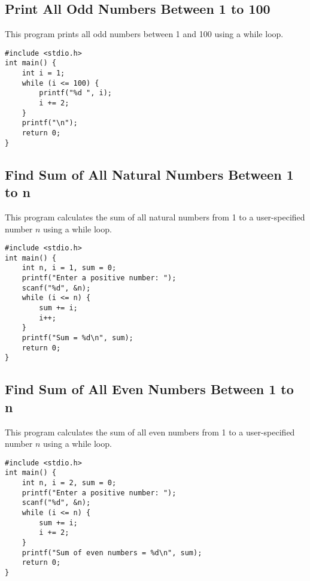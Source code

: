 \documentclass[a4paper,12pt]{article}
\begin{document}
\subsection{Print All Odd Numbers Between 1 to 100}
This program prints all odd numbers between 1 and 100 using a while loop.

\begin{lstlisting}[caption={Print All Odd Numbers Between 1 to 100}]
#include <stdio.h>
int main() {
    int i = 1;
    while (i <= 100) {
        printf("%d ", i);
        i += 2;
    }
    printf("\n");
    return 0;
}
\end{lstlisting}

\newpage

\subsection{Find Sum of All Natural Numbers Between 1 to n}
This program calculates the sum of all natural numbers from 1 to a user-specified number \(n\) using a while loop.

\begin{lstlisting}[caption={Find Sum of All Natural Numbers Between 1 to n}]
#include <stdio.h>
int main() {
    int n, i = 1, sum = 0;
    printf("Enter a positive number: ");
    scanf("%d", &n);
    while (i <= n) {
        sum += i;
        i++;
    }
    printf("Sum = %d\n", sum);
    return 0;
}
\end{lstlisting}

\newpage

\subsection{Find Sum of All Even Numbers Between 1 to n}
This program calculates the sum of all even numbers from 1 to a user-specified number \(n\) using a while loop.

\begin{lstlisting}[caption={Find Sum of All Even Numbers Between 1 to n}]
#include <stdio.h>
int main() {
    int n, i = 2, sum = 0;
    printf("Enter a positive number: ");
    scanf("%d", &n);
    while (i <= n) {
        sum += i;
        i += 2;
    }
    printf("Sum of even numbers = %d\n", sum);
    return 0;
}
\end{lstlisting}

\newpage
\end{document}
